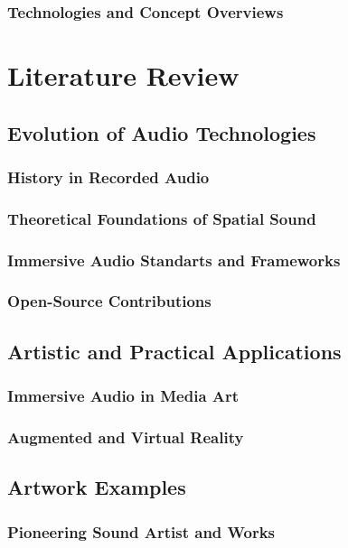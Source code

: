 \documentclass[a4paper, 12pt]{report}
\begin{document}
        \subsection{Technologies and Concept Overviews}


\chapter{Literature Review}
    \section{Evolution of Audio Technologies}
        \subsection{History in Recorded Audio}
        \subsection{Theoretical Foundations of Spatial Sound}
        \subsection{Immersive Audio Standarts and Frameworks}
        \subsection{Open-Source Contributions}
    \section{Artistic and Practical Applications}
        \subsection{Immersive Audio in Media Art}
        \subsection{Augmented and Virtual Reality}
    \section{Artwork Examples}
        \subsection{Pioneering Sound Artist and Works}
\end{document}
